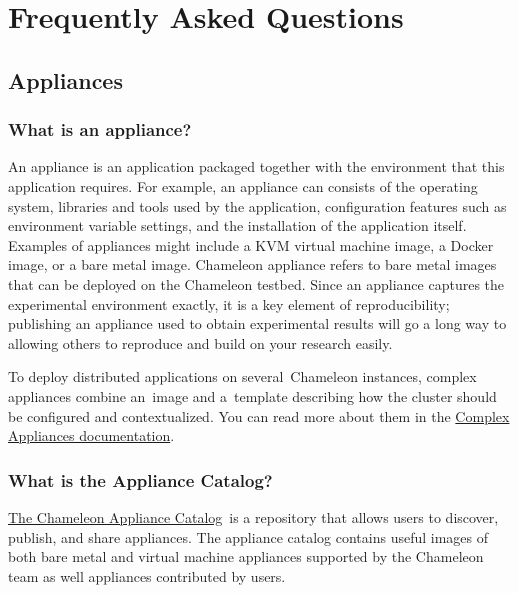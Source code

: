 

\section{Frequently Asked Questions}\label{frequently-asked-questions}

\FILENAME

\subsection{Appliances}\label{appliances}

\subsubsection{What is an appliance?}\label{what-is-an-appliance}

An appliance is an application packaged together with the environment
that this application requires. For example, an appliance can consists
of the operating system, libraries and tools used by the application,
configuration features such as environment variable settings, and the
installation of the application itself. Examples of appliances might
include a KVM virtual machine image, a Docker image, or a bare metal
image. Chameleon appliance refers to bare metal images that can be
deployed on the Chameleon testbed. Since an appliance captures the
experimental environment exactly, it is a key element of
reproducibility; publishing an appliance used to obtain experimental
results will go a long way to allowing others to reproduce and build on
your research easily.

To deploy distributed applications on several~Chameleon instances,
complex appliances combine an~image and a~template describing how the
cluster should be configured and contextualized. You can read more about
them in the
\href{https://www.chameleoncloud.org/docs/complex-appliances/}{Complex
Appliances documentation}.

\subsubsection{What is the Appliance Catalog?}\label{what-is-the-chameleon-appliance-catalog}

\href{https://www.chameleoncloud.org/appliances/}{The Chameleon
Appliance Catalog}~is a repository that allows users to discover,
publish, and share appliances. The appliance catalog contains useful
images of both bare metal and virtual machine appliances supported by
the Chameleon team as well appliances contributed by users.

